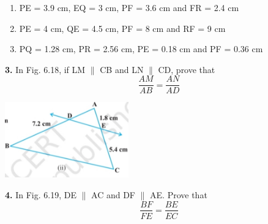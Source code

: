 \documentclass[a4paper,12pt]{article}
\begin{document}
\begin{enumerate}[label=(\roman*)]
\item PE = 3.9 cm, EQ = 3 cm, PF = 3.6 cm and FR = 2.4 cm  
\item PE = 4 cm, QE = 4.5 cm, PF = 8 cm and RF = 9 cm  
\item PQ = 1.28 cm, PR = 2.56 cm, PE = 0.18 cm and PF = 0.36 cm  
\end{enumerate}

\vspace{1em}

\textbf{3.} In Fig. 6.18, if LM $\parallel$ CB and LN $\parallel$ CD, prove that  
\[
\frac{AM}{AB} = \frac{AN}{AD}
\]


\hspace{25em}
\vspace{-15em}
\vspace{5em}\includegraphics[width=0.4\textwidth]{a2.jpg}


\vspace{1em}

\textbf{4.} In Fig. 6.19, DE $\parallel$ AC and DF $\parallel$ AE. Prove that  
\[
\frac{BF}{FE} = \frac{BE}{EC}
\]

\titleformat{\section}{\color{ncertblue}\bfseries\large}{}{0em}{}
\titleformat{\subsection}[runin]{\bfseries}{}{0em}{}[.]
\pagestyle{fancy}
\fancyhf{}
\cfoot{\textcolor{black}{Reprint 2025-26}}

\renewcommand{\headrulewidth}{0.4pt}
\renewcommand{\headrule}{\hbox to\headwidth{\color{ncertblue}\leaders\hrule height \headrulewidth\hfill}}
\setlength{\parindent}{0pt}
\onehalfspacing
\end{document}
